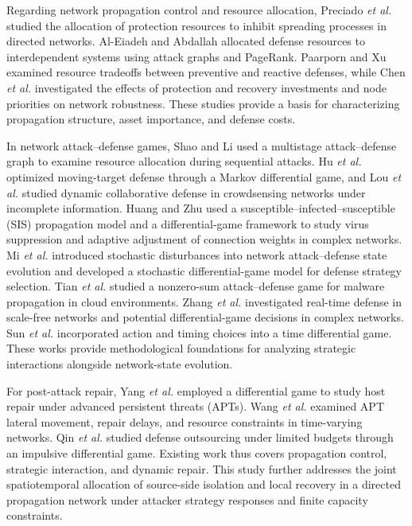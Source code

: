 \documentclass[conference,letterpaper]{IEEEtran}
\begin{document}
Regarding network propagation control and resource allocation, Preciado \emph{et al.}\cite{r1} studied the allocation of protection resources to inhibit spreading processes in directed networks. Al-Eiadeh and Abdallah\cite{r2} allocated defense resources to interdependent systems using attack graphs and PageRank. Paarporn and Xu\cite{r3} examined resource tradeoffs between preventive and reactive defenses, while Chen \emph{et al.}\cite{r4} investigated the effects of protection and recovery investments and node priorities on network robustness. These studies provide a basis for characterizing propagation structure, asset importance, and defense costs.

In network attack--defense games, Shao and Li\cite{r5} used a multistage attack--defense graph to examine resource allocation during sequential attacks. Hu \emph{et al.}\cite{r6} optimized moving-target defense through a Markov differential game, and Lou \emph{et al.}\cite{r7} studied dynamic collaborative defense in crowdsensing networks under incomplete information. Huang and Zhu\cite{r8} used a susceptible--infected--susceptible (SIS) propagation model and a differential-game framework to study virus suppression and adaptive adjustment of connection weights in complex networks. Mi \emph{et al.}\cite{r9} introduced stochastic disturbances into network attack--defense state evolution and developed a stochastic differential-game model for defense strategy selection. Tian \emph{et al.}\cite{r10} studied a nonzero-sum attack--defense game for malware propagation in cloud environments. Zhang \emph{et al.} investigated real-time defense in scale-free networks\cite{r11} and potential differential-game decisions in complex networks\cite{r12}. Sun \emph{et al.}\cite{r13} incorporated action and timing choices into a time differential game. These works provide methodological foundations for analyzing strategic interactions alongside network-state evolution.

For post-attack repair, Yang \emph{et al.}\cite{r14} employed a differential game to study host repair under advanced persistent threats (APTs). Wang \emph{et al.}\cite{r15} examined APT lateral movement, repair delays, and resource constraints in time-varying networks. Qin \emph{et al.}\cite{r16} studied defense outsourcing under limited budgets through an impulsive differential game. Existing work thus covers propagation control, strategic interaction, and dynamic repair. This study further addresses the joint spatiotemporal allocation of source-side isolation and local recovery in a directed propagation network under attacker strategy responses and finite capacity constraints.
\end{document}
